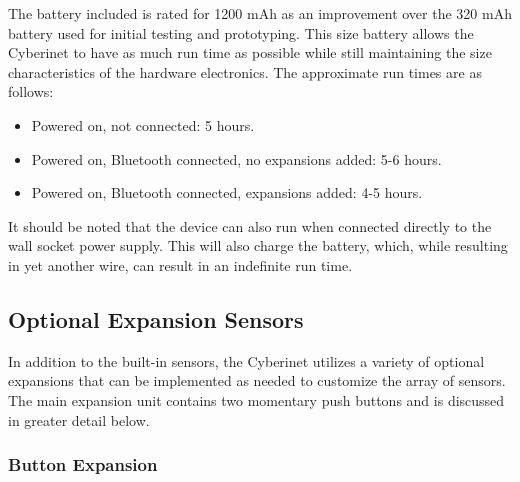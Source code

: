 The battery included is rated for 1200 mAh as an improvement over the 320 mAh battery used for initial testing and prototyping. This size battery allows the Cyberinet to have as much run time as possible while still maintaining the size characteristics of the hardware electronics. The approximate run times are as follows:

\begin{itemize}
    \item Powered on, not connected: 5 hours.
    \item Powered on, Bluetooth connected, no expansions added: 5-6 hours.
    \item Powered on, Bluetooth connected, expansions added: 4-5 hours.
\end{itemize}


It should be noted that the device can also run when connected directly to the wall socket power supply. This will also charge the battery, which, while resulting in yet another wire, can result in an indefinite run time.



\subsection{Optional Expansion Sensors}
In addition to the built-in sensors, the Cyberinet utilizes a variety of optional expansions that can be implemented as needed to customize the array of sensors. The main expansion unit contains two momentary push buttons and is discussed in greater detail below.

\subsubsection{Button Expansion}

